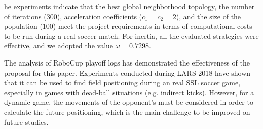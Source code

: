 \documentclass[a0,portrait]{sciposter}
\begin{document}
\begin{multicols}{3}
    he experiments indicate that the best global neighborhood topology, the number of iterations (300), acceleration coefficients ($c_1=c_2=2$), and the size of the population (100) meet the project requirements in terms of computational costs to be run during a real soccer match. For inertia, all the evaluated strategies were effective, and we adopted the value $\omega=0.7298$.

    The analysis of RoboCup playoff logs has demonstrated the effectiveness of the proposal for this paper. Experiments conducted during LARS 2018 have shown that it can be used to find field positioning during an real SSL soccer game, especially in games with dead-ball situations (e.g. indirect kicks). However, for a dynamic game, the movements of the opponent's must be considered in order to calculate the future positioning, which is the main challenge to be improved on future studies.


\end{multicols}
\end{document}
